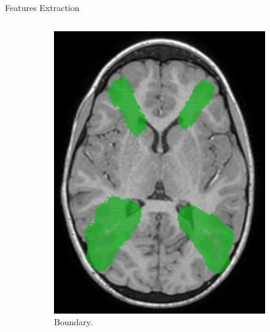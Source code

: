 \documentclass[]{standalone}
\begin{document}
\begin{frame}{Features Extraction}{}
\begin{columns}
\begin{column}{0.60\textwidth}
\begin{figure}[h!]
				\begin{subfigure}{0.4\textwidth}
					\centering
					\includegraphics[scale=0.07]{./IMG/boundary.jpg}
					\caption*{Boundary.}
				\end{subfigure}
				\hspace{15pt}
				\begin{subfigure}{0.4\textwidth}
					\centering

\end{subfigure}
\end{figure}
\end{column}
\end{columns}
\end{frame}
\end{document}
